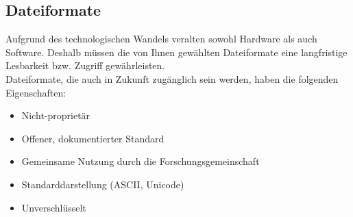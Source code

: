 \subsection{Dateiformate}
Aufgrund des technologischen Wandels veralten sowohl Hardware als auch Software.
Deshalb müssen die von Ihnen gewählten Dateiformate eine langfristige Lesbarkeit
bzw. Zugriff gewährleisten.\\
Dateiformate, die auch in Zukunft zugänglich sein werden, haben die folgenden
Eigenschaften:
\begin{itemize}
  \item Nicht-proprietär
  \item Offener, dokumentierter Standard
  \item Gemeinsame Nutzung durch die Forschungsgemeinschaft
  \item Standarddarstellung (ASCII, Unicode)
  \item Unverschlüsselt
\end{itemize}

